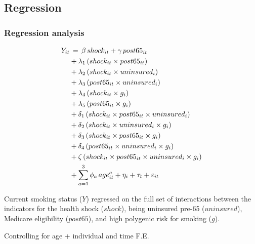 \documentclass[10pt,compress,xcolor=dvipsnames,aspectratio=169]{beamer}    %
\newcounter{ex}
\newcommand{\1}[1]{\mathrm{1\hspace*{-2.5pt}l}[#1]}	%
\begin{document}
\subsection{Regression}
\begin{frame}\frametitle{Regression analysis}
\vspace{-5ex}
\begin{footnotesize}

\begin{align*} \label{eq:OLS}
Y_{it}& \thinspace  = \thinspace
				\beta \thinspace shock_{it} + \gamma \thinspace post65_{it} \\
				&+\lambda_1 \thinspace  (shock_{it} \times post65_{it}) \nonumber \\
				&+ \lambda_2 \thinspace (shock_{it} \times uninsured_i) \nonumber \\
				&+\lambda_3  \thinspace (post65_{it} \times uninsured_i) \nonumber \\
				&+ \lambda_4 \thinspace (shock_{it} \times g_i) \nonumber \\
				&+\lambda_5 \thinspace (post65_{it} \times g_i) \nonumber \\
				&+ \delta_1 \thinspace (shock_{it} \times post65_{it} \times uninsured_i) \nonumber \\
				&+ \delta_2 \thinspace (shock_{it} \times uninsured_i \times g_i) \nonumber \\
				&+ \delta_3 \thinspace (shock_{it} \times post65_{it} \times g_i) \nonumber \\
				&+ \delta_4 \thinspace (post65_{it} \times uninsured_i \times g_i) \nonumber\\
				&+ \zeta \thinspace (shock_{it} \times post65_{it} \times uninsured_i \times g_i) \nonumber \\
				&+ \sum_{a=1}^3 \phi_a \thinspace age_{it}^{a} + \eta_i + \tau_t + \varepsilon_{it} \nonumber
\end{align*}

Current smoking status ($Y$) regressed on the full set of interactions between the indicators for the health shock ($shock$), being uninsured pre-65 ($uninsured$), Medicare eligibility ($post65$), and high polygenic risk for smoking ($g$).

Controlling for age + individual and time F.E.
\end{footnotesize}

\end{frame}
\end{document}
